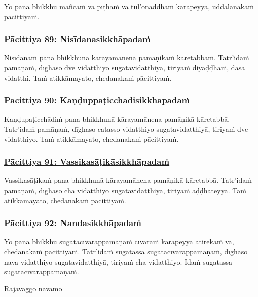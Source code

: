Yo pana bhikkhu mañcaṁ vā pīṭhaṁ vā tūl'onaddhaṁ kārāpeyya, uddālanakaṁ pācittiyaṁ.



\subsubsection*{\hyperref[exp89]{Pācittiya 89: Nisīdanasikkhāpadaṁ}}
\label{pac89}

Nisīdanaṁ pana bhikkhunā kārayamānena pamāṇikaṁ kāretabbaṁ. Tatr'idaṁ pamāṇaṁ, dīghaso dve vidatthiyo sugatavidatthiyā, tiriyaṁ diyaḍḍhaṁ, dasā vidatthi. Taṁ atikkāmayato, chedanakaṁ pācittiyaṁ.



\subsubsection*{\hyperref[exp90]{Pācittiya 90: Kaṇḍuppaṭicchādisikkhāpadaṁ}}
\label{pac90}

Kaṇḍupaṭicchādiṁ pana bhikkhunā kārayamānena pamāṇikā kāretabbā. Tatr'idaṁ pamāṇaṁ, dīghaso catasso vidatthiyo sugatavidatthiyā, tiriyaṁ dve vidatthiyo. Taṁ atikkāmayato, chedanakaṁ pācittiyaṁ.



\subsubsection*{\hyperref[exp91]{Pācittiya 91: Vassikasāṭikāsikkhāpadaṁ}}
\label{pac91}

Vassikasāṭikaṁ pana bhikkhunā kārayamānena pamāṇikā kāretabbā. Tatr'idaṁ pamāṇaṁ, dīghaso cha vidatthiyo sugatavidatthiyā, tiriyaṁ aḍḍhateyyā. Taṁ atikkāmayato, chedanakaṁ pācittiyaṁ.



\subsubsection*{\hyperref[exp92]{Pācittiya 92: Nandasikkhāpadaṁ}}
\label{pac92}

Yo pana bhikkhu sugatacīvarappamāṇaṁ cīvaraṁ kārāpeyya atirekaṁ vā, chedanakaṁ pācittiyaṁ. Tatr'idaṁ sugatassa sugatacīvarappamāṇaṁ, dīghaso nava vidatthiyo sugatavidatthiyā, tiriyaṁ cha vidatthiyo. Idaṁ sugatassa sugatacīvarappamāṇaṁ.

\begin{center}
	Rājavaggo navamo
\end{center}



